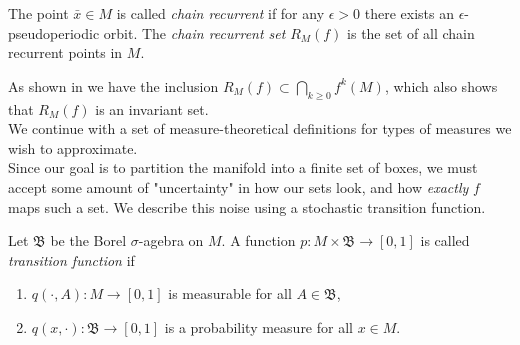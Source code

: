 \begin{definition}
    \cite*{dynbook} The point $\bar{x} \in M$ is called \emph{chain recurrent} if for any $\epsilon > 0$ 
    there exists an $\epsilon$-pseudoperiodic orbit. The \emph{chain recurrent set} $R_M(f)$ 
    is the set of all chain recurrent points in $M$.
\end{definition}

As shown in \cite*{algGAIO} we have the inclusion $R_M(f) \subset \bigcap_{k \geq 0} f^k(M)$,
which also shows that $R_M(f)$ is an invariant set. \\

We continue with a set of measure-theoretical definitions for types of measures we wish to 
approximate. \\

Since our goal is to partition the manifold into a finite set of boxes, we must accept some
amount of "uncertainty" in how our sets look, and how \emph{exactly} $f$ maps such a set.
We describe this noise using a stochastic transition function. 

\begin{definition}
    \cite*{attr} Let $\mathfrak{B}$ be the Borel $\sigma$-agebra on $M$. A function 
    $p : M \times \mathfrak{B} \to [0,1]$ is called \emph{transition function} if

    \begin{enumerate}
        \item $q(\cdot, A) : M \to [0,1]$ is measurable for all $A \in \mathfrak{B}$,
        \item $q(x, \cdot) : \mathfrak{B} \to [0,1]$ is a probability measure for all $x \in M$.
    \end{enumerate}

\end{definition}

